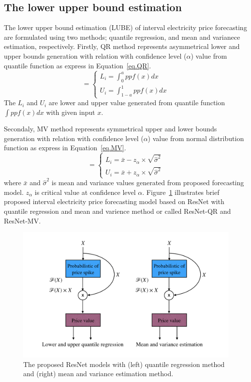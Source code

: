 \documentclass[review]{elsarticle}
\begin{document}
    \subsection{The lower upper bound estimation}
      The lower upper bound estimation (LUBE) of interval electricity price forecasting are formulated using two methods; quantile regression, and mean and varianece estimation, respectively.
      Firstly, QR method represents asymmetrical lower and upper bounds generation with relation with confidence level ($\alpha$) value from quantile function as express in Equation~\ref{eq.QR}.
      \begin{equation}
        [L_{i}, U_{i}]=
        \begin{cases}
        L_{i}=\int_{0}^{a} ppf(x) dx\\
        U_{i}=\int_{1-a}^{1} ppf(x) dx
        \end{cases}
        \label{eq.QR}
      \end{equation}
      The $L_{i}$ and $U_{i}$ are lower and upper value generated from quantile function $\int ppf(x) dx$ with given input $x$.

      Secondaly, MV method represents symmetrical upper and lower bounds generation with relation with confidence level ($\alpha$) value from normal distribution function as express in Equation~\ref{eq.MV}.
      \begin{equation}
        [L_{i}, U_{i}]=
        \begin{cases}
          L_{i}=\bar{x} - z_{\alpha} \times \sqrt{\hat{\sigma}^2}\\
          U_{i}=\bar{x} + z_{\alpha} \times \sqrt{\hat{\sigma}^2}
        \end{cases}
        \label{eq.MV}
      \end{equation}
      where $\bar{x}$ and $\hat{\sigma}^2$ is mean and variance values generated from proposed forecasting model. $z_{\alpha}$ is critical value at confidence level $\alpha$.
      Figure~\ref{Fig:UB_LB_MV_PDRNN} illustrates brief proposed interval electricity price forecasting model based on ResNet with quantile regression and mean and varience method or called ResNet-QR and ResNet-MV.
      \begin{figure}[H]
        \includegraphics[width=12cm]{UB_LB_MV_PDRNN}
        \caption{The proposed ResNet models with (left) quantile regression method and (right) mean and variance estimation method.}
        \label{Fig:UB_LB_MV_PDRNN}
        \centering
      \end{figure}
\end{document}
